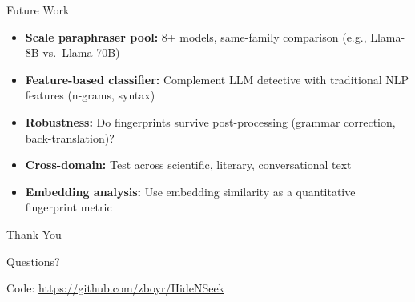 \documentclass[aspectratio=169]{beamer}
\begin{document}
\begin{frame}{Future Work}

\begin{itemize}
    \item \textbf{Scale paraphraser pool:} 8+ models, same-family comparison (e.g., Llama-8B vs.\ Llama-70B)
    \item \textbf{Feature-based classifier:} Complement LLM detective with traditional NLP features (n-grams, syntax)
    \item \textbf{Robustness:} Do fingerprints survive post-processing (grammar correction, back-translation)?
    \item \textbf{Cross-domain:} Test across scientific, literary, conversational text
    \item \textbf{Embedding analysis:} Use embedding similarity as a quantitative fingerprint metric
\end{itemize}

\end{frame}

\begin{frame}{}
\begin{center}
{\Huge Thank You}

\vspace{1cm}
{\large Questions?}

\vspace{1cm}
{\small Code: \url{https://github.com/zboyr/HideNSeek}}
\end{center}
\end{frame}
\end{document}
